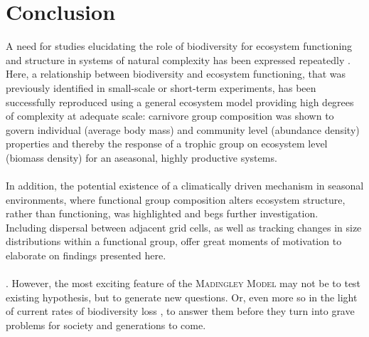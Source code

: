 \chapter{Conclusion}
A need for studies elucidating the role of biodiversity for ecosystem functioning and structure in systems of natural complexity has been expressed repeatedly \citep[e.g.][]{Hooper2012,Naeem2012,Tilman2014}.\\
Here, a relationship between biodiversity and ecosystem functioning, that was previously identified in small-scale or short-term experiments, has been successfully reproduced using a general ecosystem model providing high degrees of complexity at adequate scale:
carnivore group composition was shown to govern individual (average body mass) and community level (abundance density)  properties and thereby the response of a trophic group on ecosystem level (biomass density) for an aseasonal, highly productive systems. \\\\
In addition, the potential existence of a climatically driven mechanism in seasonal environments, where functional group composition alters ecosystem structure, rather than functioning, 
was highlighted and begs further investigation.\\
Including dispersal between adjacent grid cells, as well as tracking changes in size distributions within a functional group, offer great moments of motivation to elaborate on findings presented here. 
\\\\
.
 However, the most exciting feature of the \textsc{Madingley Model} may not be to test existing hypothesis, but to generate new questions. Or, even more so in the light of current rates of biodiversity loss \citep{Ceballos2015, Urban2015}, to answer them before they turn into grave problems for society and generations to come. 
